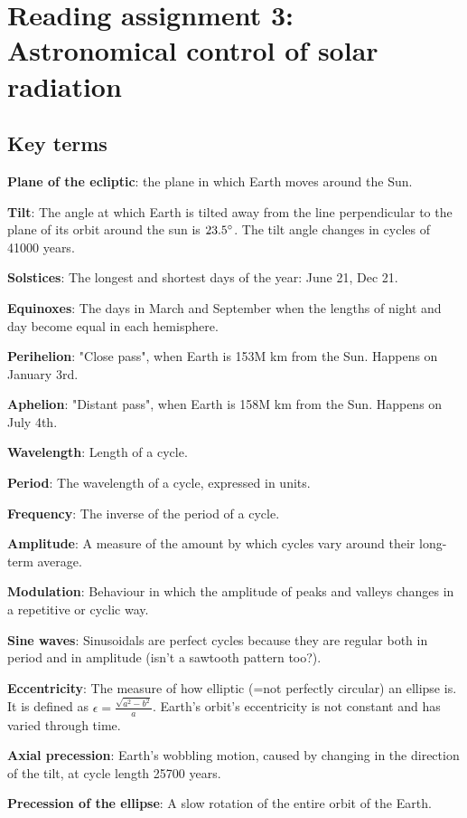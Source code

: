 \section{Reading assignment 3: Astronomical control of solar radiation}

\subsection{Key terms}

\textbf{Plane of the ecliptic}: the plane in which Earth moves around the Sun.

\textbf{Tilt}: The angle at which Earth is tilted away from the line
perpendicular to the plane of its orbit around the sun is $23.5 \degree$. The
tilt angle changes in cycles of 41000 years.

\textbf{Solstices}: The longest and shortest days of the year: June 21, Dec 21.

\textbf{Equinoxes}: The days in March and September when the lengths of night
and day become equal in each hemisphere.

\textbf{Perihelion}: "Close pass", when Earth is 153M km from the Sun. Happens
on January 3rd.

\textbf{Aphelion}: "Distant pass", when Earth is 158M km from the Sun. Happens
on July 4th.

\textbf{Wavelength}: Length of a cycle.

\textbf{Period}: The wavelength of a cycle, expressed in units.

\textbf{Frequency}: The inverse of the period of a cycle.

\textbf{Amplitude}: A measure of the amount by which cycles vary around their
long-term average.

\textbf{Modulation}: Behaviour in which the amplitude of peaks and valleys
changes in a repetitive or cyclic way.

\textbf{Sine waves}: Sinusoidals are perfect cycles because they are regular
both in period and in amplitude (isn't a sawtooth pattern too?).

\textbf{Eccentricity}: The measure of how elliptic (=not perfectly circular)
an ellipse is. It is defined as $\epsilon = \frac{\sqrt{a^2 - b^2}}{a}$.
Earth's orbit's eccentricity is not constant and has varied through time.

\textbf{Axial precession}: Earth's wobbling motion, caused by changing in the
direction of the tilt, at cycle length 25700 years.

\textbf{Precession of the ellipse}: A slow rotation of the entire orbit of the
Earth.

